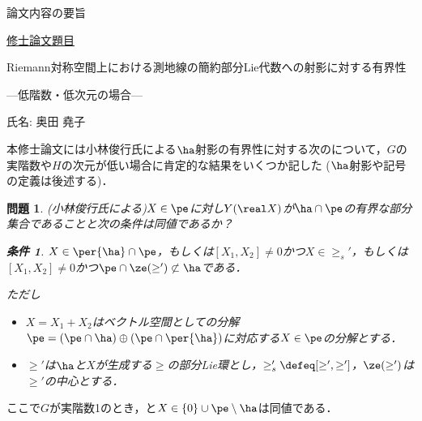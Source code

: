 \documentclass[12pt,dvipdfmx,uplatex]{jsarticle}
\newcounter{countabst}
\newtheorem{prob-a}[countabst]{問題}
\newtheorem{cond-a}[countabst]{条件}
\newcommand{\nsubset}{\not\subset}
\begin{document}
% 
\begin{center}
  論文内容の要旨
\end{center}
\vspace{-0.5em}
\noindent\underline{修士論文題目}
\vspace{-1em}
\begin{center}
  Riemann対称空間上における測地線の簡約部分Lie代数への射影に対する有界性

  ---低階数・低次元の場合---
\end{center}
\vspace{-0.5em}

\noindent 氏名: 奥田 堯子

\vspace{0.5em}

本修士論文には小林俊行氏による$\ha$射影の有界性に対する次のについて，$G$の実階数や$H$の次元が低い場合に肯定的な結果をいくつか記した ($\ha$射影や記号の定義は後述する)．

\begin{prob-a}(小林俊行氏による)\label{prob:1121}
  $X\in \pe$に対し$Y(\real X)$が$ \ha\cap \pe$の有界な部分集合であることと次の条件は同値であるか？
  \begin{cond-a}\label{cond:a}
    $X\in \per{\ha}\cap\pe $，もしくは$[X_1, X_2] \neq 0 $かつ$X\in \ge_{s}' $，もしくは$[X_1, X_2] \neq 0 $かつ$\pe\cap \ze(\ge') \nsubset \ha  $である．
  \end{cond-a}
  
  ただし  
  \begin{itemize}
    \vspace{-1em}
  \item $X = X_1 + X_2 $はベクトル空間としての分解$\pe =(\pe\cap \ha)\oplus(\pe\cap\per{\ha}) $に対応する$X\in \pe$の分解とする．
  \item $\ge ' $は$\ha$と$X$が生成する$\ge$の部分Lie環とし，$\ge'_{s} \defeq [\ge',\ge'] $，$\ze(\ge') $は$\ge'$の中心とする．
  \end{itemize}
\end{prob-a}
\vspace{-0.5em}
ここで$G$が実階数1のとき，と$X\in \{0\}\cup\pe\setminus\ha $は同値である．
\end{document}
